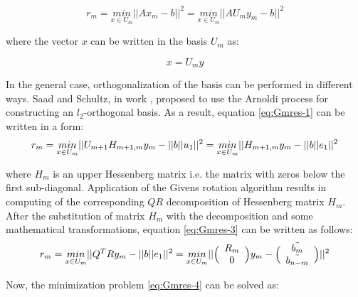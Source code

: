 \begin{equation} \label{eq:Gmres-1}
	r_{m} = \underset{x \in U_m}{min}||Ax_{m} - b||^2 =  \underset{x \in U_m}{min}||AU_m y_{m} - b||^2
\end{equation}

where the vector $x$ can be written in the basis $U_m$ as:

\begin{equation} \label{eq:Gmres-2}
		x = U_{m} y
\end{equation}

In the general case, orthogonalization of the basis can be performed in different ways. Saad and Schultz, in work \cite{sparse-la:gmrese-origin}, proposed to use the Arnoldi process for constructing an $l_2$-orthogonal basis. As a result, equation \ref{eq:Gmres-1} can be written in a form:  \\

\begin{equation} \label{eq:Gmres-3}
	r_{m} = \underset{x \in U_m}{min}||U_{m+1}H_{m+1,m} y_{m} - ||b||u_1||^2 = \\
	\underset{x \in U_m}{min}||H_{m+1,m} y_{m} - ||b||e_1||^2 
\end{equation}

where $H_{m}$ is an upper Hessenberg matrix i.e. the matrix with zeros below the first sub-diagonal. Application of the Givens rotation algorithm results in computing of the corresponding $QR$ decomposition of Hessenberg matrix $H_{m}$. After the substitution of matrix $H_{m}$ with the decomposition and some mathematical transformations, equation \ref{eq:Gmres-3} can be written as follows:\\

 
\begin{equation} \label{eq:Gmres-4}
	r_{m} = \\
	\underset{x \in U_m}{min}||Q^{T}Ry_{m} - ||b||e_{1}||^2 = \\
	\underset{x \in U_m}{min}||\Big(\begin{array}{c c}R_m \\ 0 \\\end{array}\Big) y_{m} - \Big(\begin{array}{c c} \tilde{b_m} \\ \tilde{b_{n-m}} \\\end{array}\Big)||^2
\end{equation}

Now, the minimization problem \ref{eq:Gmres-4} can be solved as:\\

